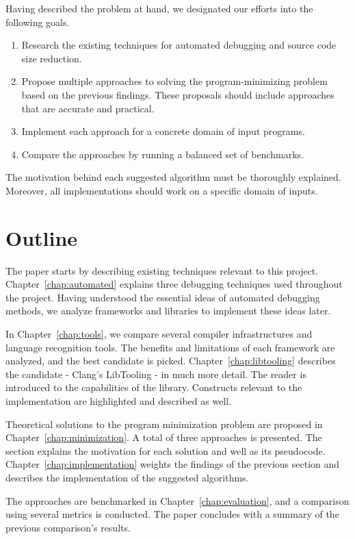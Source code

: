 Having described the problem at hand, we designated our efforts into 
the following goals.
\begin{enumerate}
  \item Research the existing techniques for automated debugging and source 
  code size reduction.
  \item Propose multiple approaches to solving the program-minimizing problem based 
  on the previous findings. 
  These proposals should include approaches that are accurate and practical.
  \item Implement each approach for a concrete domain of input programs.
  \item Compare the approaches by running a balanced set of benchmarks.
\end{enumerate}
The motivation behind each suggested algorithm must be thoroughly explained. 
Moreover, all implementations should work on a specific domain of inputs.

\section{Outline}

The paper starts by describing existing techniques relevant to this project. 
Chapter~\ref{chap:automated} explains three debugging techniques used 
throughout the project. 
Having understood the essential ideas of automated debugging methods, we 
analyze frameworks and libraries to implement these ideas later. 

In Chapter~\ref{chap:tools}, we compare several compiler infrastructures and 
language recognition tools. 
The benefits and limitations of each framework are analyzed, and the best 
candidate is picked. 
Chapter~\ref{chap:libtooling} describes the candidate - Clang's LibTooling - 
in much more detail. 
The reader is introduced to the capabilities of the library. 
Constructs relevant to the implementation are highlighted and described as 
well. 

Theoretical solutions to the program minimization problem are proposed in 
Chapter~\ref{chap:minimization}.
A total of three approaches is presented. 
The section explains the motivation for each solution and well as its 
pseudocode. 
Chapter~\ref{chap:implementation} weights the findings of the previous 
section and describes the implementation of the suggested algorithms. 

The approaches are benchmarked in Chapter~\ref{chap:evaluation}, and 
a comparison using several metrics is conducted. 
The paper concludes with a summary of the previous comparison's results.

